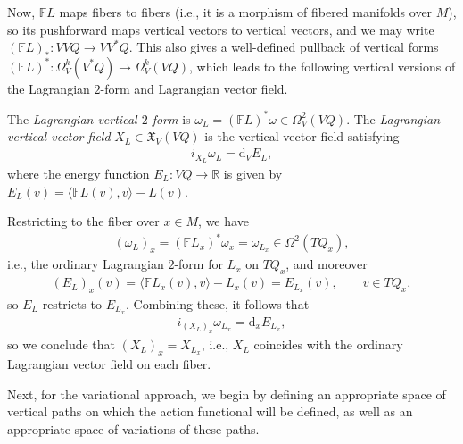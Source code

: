 \documentclass[10pt,a4paper]{amsart}
\numberwithin{equation}{section}
\begin{document}
Now, $ \mathbb{F} L $ maps f\/ibers to f\/ibers (i.e., it is a morphism of f\/ibered manifolds over $M$), so its pushforward maps vertical vectors
to vertical vectors, and we may write $( \mathbb{F} L ) _\ast \colon V V Q \rightarrow V V ^\ast Q $. This also gives a well-def\/ined pullback of vertical forms $ ( \mathbb{F} L ) ^\ast \colon \Omega ^k _V ( V ^\ast Q ) \rightarrow \Omega ^k _V ( V Q ) $, which leads to the following vertical versions of the Lagrangian $2$-form and Lagrangian vector f\/ield.

\begin{Definition} The \emph{Lagrangian vertical $2$-form} is $ \omega _L = ( \mathbb{F} L ) ^\ast \omega \in \Omega ^2 _V ( V Q )
 $. The \emph{Lagrangian vertical vector field} $ X _L \in \mathfrak{X} _V ( V Q ) $ is the vertical vector f\/ield satisfying
 \begin{gather*}
 i _{ X _L } \omega _L = \mathrm{d} _V E _L ,
 \end{gather*}
where the energy function $ E _L \colon V Q \rightarrow \mathbb{R} $ is given by $E _L (v) = \bigl\langle \mathbb{F} L (v) , v \bigr\rangle - L (v)$.
\end{Definition}

\begin{Remark} Restricting to the f\/iber over $ x \in M $, we have
\begin{gather*}
 ( \omega _L ) _x = ( \mathbb{F} L _x ) ^\ast \omega _x = \omega _{L _x} \in \Omega ^2 ( T Q _x ) ,
\end{gather*}
i.e., the ordinary Lagrangian $2$-form for $ L _x $ on $ T Q _x $, and moreover
\begin{gather*}
 ( E _L ) _x (v) = \bigl\langle \mathbb{F} L _x (v) , v \bigr\rangle- L _x (v) = E _{ L _x } (v) , \qquad v \in T Q _x ,
\end{gather*}
so $ E _L $ restricts to $ E _{ L _x } $. Combining these, it follows that
\begin{gather*}
 i _{ (X _L) _x } \omega _{ L _x } = \mathrm{d} _x E _{ L _x } ,
\end{gather*}
so we conclude that $ ( X _L ) _x = X _{ L _x } $, i.e., $ X _L $ coincides with the ordinary Lagrangian vector f\/ield on each f\/iber.
\end{Remark}

Next, for the variational approach, we begin by def\/ining an appropriate space of vertical paths on which the action functional will be def\/ined, as well as an appropriate space of variations of these paths.
\end{document}
